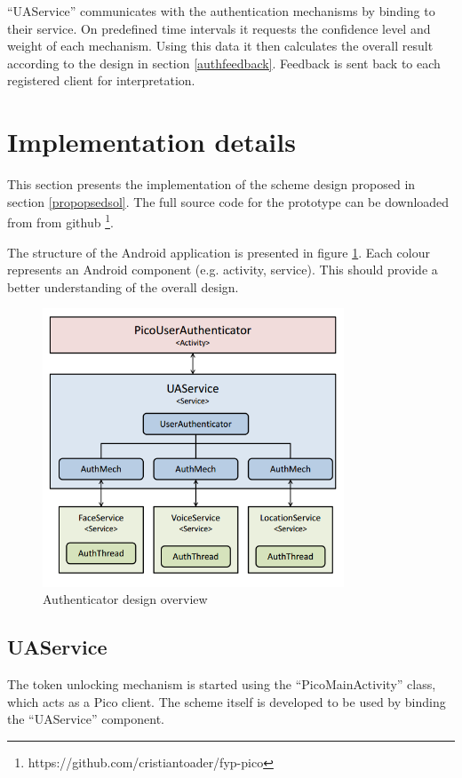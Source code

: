 ``UAService'' communicates with the authentication mechanisms by binding to their service. On predefined time intervals it requests the confidence level and weight of each mechanism. Using this data it then calculates the overall result according to the design in section \ref{authfeedback}. Feedback is sent back to each registered client for interpretation.

\section{Implementation details}
This section presents the implementation of the scheme design proposed in section \ref{propopsedsol}. The full source code for the prototype can be downloaded from from github \footnote{https://github.com/cristiantoader/fyp-pico}. 

The structure of the Android application is presented in figure \ref{fig:overview}. Each colour represents an Android component (e.g. activity, service). This should provide a better understanding of the overall design.
\begin{figure}[p]
    \centering
    \includegraphics[width=0.8\textwidth]{Pictures/overview-uml}
    \caption{Authenticator design overview}
    \label{fig:overview}
\end{figure}

\subsection{UAService}
The token unlocking mechanism is started using the ``PicoMainActivity'' class, which acts as a Pico client. The scheme itself is developed to be used by binding the ``UAService'' component.

